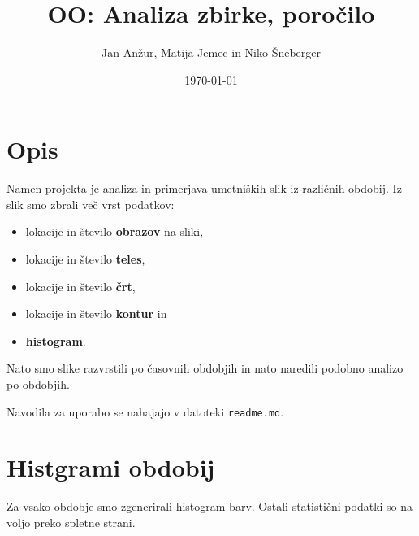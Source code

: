 \documentclass{article}
\title{OO: Analiza zbirke, poročilo}
\date{\today}
\author{Jan Anžur, Matija Jemec in Niko Šneberger}
\begin{document}
	\maketitle
	\newpage

	\section{Opis}

		Namen projekta je analiza in primerjava umetniških slik iz različnih obdobij.
		Iz slik smo zbrali več vrst podatkov:

		\begin{itemize}
			\item lokacije in število \textbf{obrazov} na sliki,
			\item lokacije in število \textbf{teles},
			\item lokacije in število \textbf{črt},
			\item lokacije in število \textbf{kontur} in
			\item \textbf{histogram}.
		\end{itemize}

		Nato smo slike razvrstili po časovnih obdobjih in nato naredili podobno analizo
		po obdobjih.

		Navodila za uporabo se nahajajo v datoteki \texttt{readme.md}.

	\newpage

	\section{Histgrami obdobij}
		Za vsako obdobje smo zgenerirali histogram barv.
		Ostali statistični podatki so na voljo preko spletne strani.
\end{document}
